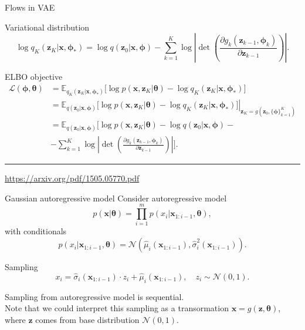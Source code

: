 \documentclass{beamer}
\newcommand{\bx}{\mathbf{x}}
\newcommand{\bz}{\mathbf{z}}
\newcommand{\btheta}{\boldsymbol{\theta}}
\newcommand{\bphi}{\boldsymbol{\phi}}
\begin{document}
\begin{frame}{Flows in VAE}
	\begin{block}{Variational distribution}
		\vspace{-0.5cm}
		\[
			\log q_K(\bz_K | \bx, \bphi_*) = \log q(\bz_0 | \bx, \bphi) - \sum_{k=1}^K \log \left| \det \left( \frac{\partial g_k(\bz_{k - 1}, \bphi_k)}{\partial \bz_{k-1}} \right) \right|.
		\]
		\vspace{-0.5cm}
	\end{block}
	\begin{block}{ELBO objective}
		\vspace{-0.5cm}
		\begin{align*}
			\mathcal{L} (\bphi, \btheta) 
			&= \mathbb{E}_{q_K(\bz_K | \bx, \bphi_*)} \bigl[\log p(\bx, \bz_K | \btheta) - \log q_K(\bz_K| \bx, \bphi_*) \bigr] \\
			&= \mathbb{E}_{q(\bz_0 | \bx, \bphi)} \left. \bigl[\log p(\bx, \bz_K | \btheta) - \log q_K(\bz_K| \bx, \bphi_*) \bigr]\right|_{\bz_K = g(\bz_0, \{\bphi\}_{k=1}^K)} \\
			&= \mathbb{E}_{q(\bz_0 | \bx, \bphi)} \bigg[\log p(\bx, \bz_K | \btheta) -  \log q(\bz_0 | \bx, \bphi ) - \\ & - \sum_{k=1}^K \log \left| \det \left( \frac{\partial g_k(\bz_{k - 1}, \bphi_k)}{\partial \bz_{k-1}} \right) \right| \bigg].
		\end{align*}
	\end{block}
	\vfill
	\hrule\medskip
	{\scriptsize \href{https://arxiv.org/pdf/1505.05770.pdf}{https://arxiv.org/pdf/1505.05770.pdf}} 
\end{frame}
\begin{frame}{Gaussian autoregressive model}
	Consider autoregressive model
	\[
		p(\bx | \btheta) = \prod_{i=1}^m p(x_i | \bx_{1:i - 1}, \btheta),
	\]
	with conditionals
	\[
	p(x_i | \bx_{1:i - 1}, \btheta) = \mathcal{N} \left(\hat{\mu}_i(\bx_{1:i-1}), \hat{\sigma}^2_i (\bx_{1:i-1})\right).
	\]
	\vspace{-0.5cm}
	\begin{block}{Sampling}
		\[
		x_i = \hat{\sigma}_i (\bx_{1:i-1}) \cdot z_i + \hat{\mu}_i(\bx_{1:i-1}), \quad z_i \sim \mathcal{N}(0, 1).
		\]
	\end{block}
	Sampling from autoregressive model is sequential. \\
	Note that we could interpret this sampling as a transormation $\bx = g(\bz, \btheta)$, where $\bz$ comes from base distribution $\mathcal{N}(0, 1)$.
\end{frame}
\end{document}
